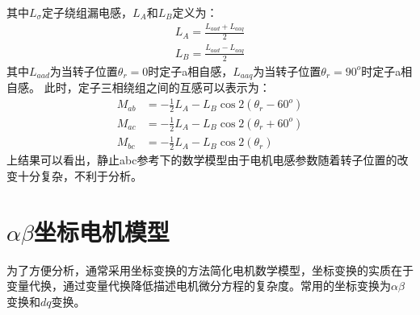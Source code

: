 其中$L_{\sigma}$定子绕组漏电感，$L_{A}$和$L_{B}$定义为：
\begin{align}\label{eq:induc2}
L_{A}= \frac{L_{aad}+L_{aaq}}{2}\\
L_{B}= \frac{L_{aad}-L_{aaq}}{2} 
\end{align}
其中$L_{aad}$为当转子位置$\theta_{r}=0$时定子a相自感，$L_{aaq}$为当转子位置$\theta_{r}=90^{o}$时定子a相自感。
此时，定子三相绕组之间的互感可以表示为：
\begin{align}
M_{ab}&=-\frac{1}{2}L_{A}-L_{B}\cos2(\theta_{r}-60^{o})\label{eq：Mab}\\
M_{ac}&=-\frac{1}{2}L_{A}-L_{B}\cos2(\theta_{r}+60^{o})\label{eq:Mac}\\
M_{bc}&=-\frac{1}{2}L_{A}-L_{B}\cos2(\theta_{r})\label{eq:Mbc}
\end{align}
上结果可以看出，静止abc参考下的数学模型由于电机电感参数随着转子位置的改变十分复杂，不利于分析。
\section{$\alpha\beta$坐标电机模型}\label{sec:model}
为了方便分析，通常采用坐标变换的方法简化电机数学模型，坐标变换的实质在于变量代换，通过变量代换降低描述电机微分方程的复杂度。常用的坐标变换为$\alpha\beta$变换和$dq$变换。
